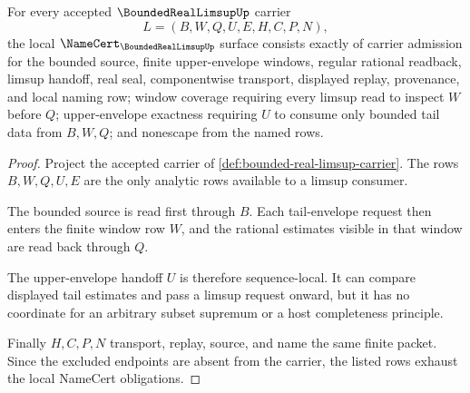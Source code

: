 \begin{theorem}
\label{thm:bounded-real-limsup-namecert-obligations}
For every accepted $\BoundedRealLimsupUp$ carrier
$$
L=(B,W,Q,U,E,H,C,P,N),
$$
the local $\NameCert_{\BoundedRealLimsupUp}$ surface consists exactly of carrier admission for the bounded source, finite upper-envelope windows, regular rational readback, limsup handoff, real seal, componentwise transport, displayed replay, provenance, and local naming row; window coverage requiring every limsup read to inspect $W$ before $Q$; upper-envelope exactness requiring $U$ to consume only bounded tail data from $B,W,Q$; and nonescape from the named rows.
\end{theorem}
\begin{proof}
Project the accepted carrier of \autoref{def:bounded-real-limsup-carrier}. The rows $B,W,Q,U,E$ are the only analytic rows available to a limsup consumer.

The bounded source is read first through $B$. Each tail-envelope request then enters the finite window row $W$, and the rational estimates visible in that window are read back through $Q$.

The upper-envelope handoff $U$ is therefore sequence-local. It can compare displayed tail estimates and pass a limsup request onward, but it has no coordinate for an arbitrary subset supremum or a host completeness principle.

Finally $H,C,P,N$ transport, replay, source, and name the same finite packet. Since the excluded endpoints are absent from the carrier, the listed rows exhaust the local NameCert obligations.
\end{proof}

